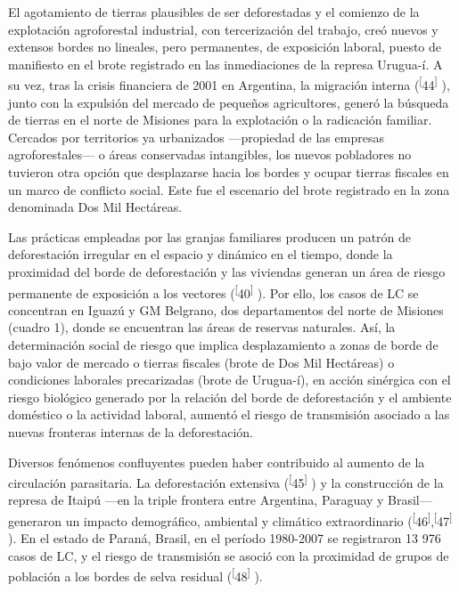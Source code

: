 \documentclass{article}
\begin{document}
El agotamiento de tierras plausibles de ser deforestadas y el comienzo de la
explotación agroforestal industrial, con tercerización del trabajo, creó nuevos
y extensos bordes no lineales, pero permanentes, de exposición laboral, puesto
de manifiesto en el brote registrado en las inmediaciones de la represa
Urugua-í. A su vez, tras la crisis financiera de 2001 en Argentina, la migración
interna (\textsuperscript{[}44\textsuperscript{]}
), junto con la expulsión del mercado de pequeños agricultores, generó la
búsqueda de tierras en el norte de Misiones para la explotación o la radicación
familiar. Cercados por territorios ya urbanizados —propiedad de las empresas
agroforestales— o áreas conservadas intangibles, los nuevos pobladores no
tuvieron otra opción que desplazarse hacia los bordes y ocupar tierras fiscales
en un marco de conflicto social. Este fue el escenario del brote registrado en
la zona denominada Dos Mil Hectáreas.

Las prácticas empleadas por las granjas familiares producen un patrón de
deforestación irregular en el espacio y dinámico en el tiempo, donde la
proximidad del borde de deforestación y las viviendas generan un área de riesgo
permanente de exposición a los vectores
(\textsuperscript{[}40\textsuperscript{]}
). Por ello, los casos de LC se concentran en Iguazú y GM Belgrano, dos
departamentos del norte de Misiones (cuadro 1), donde se encuentran las áreas de
reservas naturales. Así, la determinación social de riesgo que implica
desplazamiento a zonas de borde de bajo valor de mercado o tierras fiscales
(brote de Dos Mil Hectáreas) o condiciones laborales precarizadas (brote de
Urugua-í), en acción sinérgica con el riesgo biológico generado por la relación
del borde de deforestación y el ambiente doméstico o la actividad laboral,
aumentó el riesgo de transmisión asociado a las nuevas fronteras internas de la
deforestación.

Diversos fenómenos confluyentes pueden haber contribuido al aumento de la
circulación parasitaria. La deforestación extensiva
(\textsuperscript{[}45\textsuperscript{]}
) y la construcción de la represa de Itaipú —en la triple frontera entre
Argentina, Paraguay y Brasil— generaron un impacto demográfico, ambiental y
climático extraordinario (\textsuperscript{[}46\textsuperscript{]},\textsuperscript{[}47\textsuperscript{]}
). En el estado de Paraná, Brasil, en el período 1980-2007 se registraron 13 976
casos de LC, y el riesgo de transmisión se asoció con la proximidad de grupos de
población a los bordes de selva residual
(\textsuperscript{[}48\textsuperscript{]}
).
\end{document}

